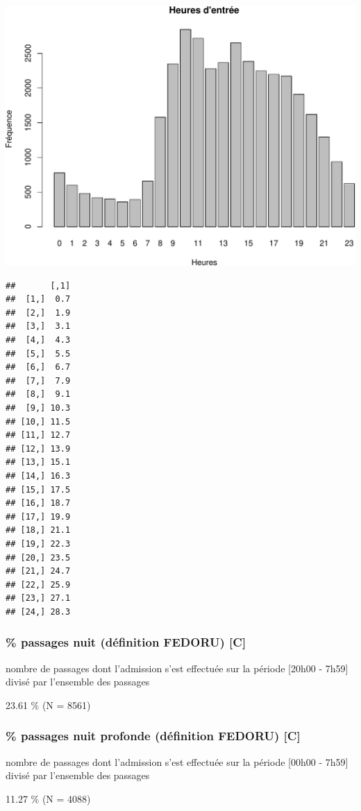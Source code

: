 \documentclass[]{article}
\begin{document}
\includegraphics{rapport_2014_files/figure-latex/horaires-1.pdf}

\begin{verbatim}
##       [,1]
##  [1,]  0.7
##  [2,]  1.9
##  [3,]  3.1
##  [4,]  4.3
##  [5,]  5.5
##  [6,]  6.7
##  [7,]  7.9
##  [8,]  9.1
##  [9,] 10.3
## [10,] 11.5
## [11,] 12.7
## [12,] 13.9
## [13,] 15.1
## [14,] 16.3
## [15,] 17.5
## [16,] 18.7
## [17,] 19.9
## [18,] 21.1
## [19,] 22.3
## [20,] 23.5
## [21,] 24.7
## [22,] 25.9
## [23,] 27.1
## [24,] 28.3
\end{verbatim}

\subsubsection{\% passages nuit (définition FEDORU)
{[}C{]}}\label{passages-nuit-definition-fedoru-c}

nombre de passages dont l'admission s'est effectuée sur la période
{[}20h00 - 7h59{]} divisé par l'ensemble des passages

23.61 \% (N = 8561)

\subsubsection{\% passages nuit profonde (définition FEDORU)
{[}C{]}}\label{passages-nuit-profonde-definition-fedoru-c}

nombre de passages dont l'admission s'est effectuée sur la période
{[}00h00 - 7h59{]} divisé par l'ensemble des passages

11.27 \% (N = 4088)
\end{document}
